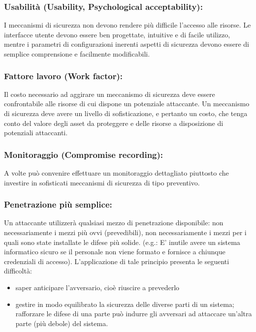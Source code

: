 \subsubsection{Usabilità (Usability, Psychological acceptability):} I meccanismi di sicurezza non devono rendere più difficile l’accesso alle risorse. Le interfacce utente devono essere ben progettate, intuitive e di facile utilizzo, mentre i parametri di configurazioni inerenti aspetti di sicurezza devono essere di semplice comprensione e facilmente modificabili.

\subsubsection{Fattore lavoro (Work factor):} Il costo necessario ad aggirare un meccanismo di sicurezza deve essere confrontabile alle risorse di cui dispone un potenziale attaccante. Un meccanismo di sicurezza deve avere un livello di sofisticazione, e pertanto un costo, che tenga conto del valore degli asset da proteggere e delle risorse a disposizione di potenziali attaccanti.

\subsubsection{Monitoraggio (Compromise recording):} A volte può convenire effettuare un monitoraggio dettagliato piuttosto che investire in sofisticati meccanismi di sicurezza di tipo preventivo.

\subsubsection{Penetrazione più semplice:} Un attaccante utilizzerà qualsiasi mezzo di penetrazione disponibile: non necessariamente i mezzi più ovvi (prevedibili), non necessariamente i mezzi per i quali sono state installate le difese più solide. (e.g.: E' inutile avere un sistema informatico sicuro se il personale non viene formato e fornisce a chiunque credenziali di accesso). L’applicazione di tale principio presenta le seguenti difficoltà:
\begin{itemize} 
  \item saper anticipare l’avversario, cioè riuscire a prevederlo
  \item gestire in modo equilibrato la sicurezza delle diverse parti di un sistema; rafforzare le difese di una parte può indurre gli avversari ad attaccare un'altra parte (più debole) del sistema.
\end{itemize}

